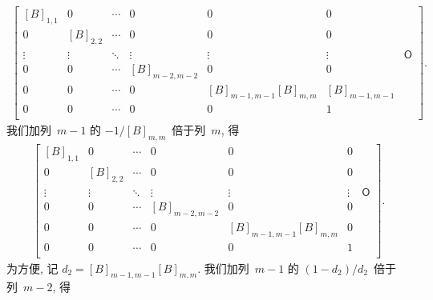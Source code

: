\documentclass[../libro.tex]{subfiles}
\begin{document}
\begin{align*}
    \begin{bmatrix}
        [B]_{1,1} & 0         & \cdots & 0             & 0                       & 0             & {}         \\
        0         & [B]_{2,2} & \cdots & 0             & 0                       & 0             & {}         \\
        \vdots    & \vdots    & \ddots & \vdots        & \vdots                  & \vdots        & \mathsf{O} \\
        0         & 0         & \cdots & [B]_{m-2,m-2} & 0                       & 0             & {}         \\
        0         & 0         & \cdots & 0             & [B]_{m-1,m-1} [B]_{m,m} & [B]_{m-1,m-1} & {}         \\
        0         & 0         & \cdots & 0             & 0                       & 1             & {}         \\
    \end{bmatrix}.
\end{align*}
我们加列~\(m-1\) 的 \(-1/[B]_{m,m}\)~倍于列~\(m\), 得
\begin{align*}
    \begin{bmatrix}
        [B]_{1,1} & 0         & \cdots & 0             & 0                       & 0      & {}         \\
        0         & [B]_{2,2} & \cdots & 0             & 0                       & 0      & {}         \\
        \vdots    & \vdots    & \ddots & \vdots        & \vdots                  & \vdots & \mathsf{O} \\
        0         & 0         & \cdots & [B]_{m-2,m-2} & 0                       & 0      & {}         \\
        0         & 0         & \cdots & 0             & [B]_{m-1,m-1} [B]_{m,m} & 0      & {}         \\
        0         & 0         & \cdots & 0             & 0                       & 1      & {}         \\
    \end{bmatrix}.
\end{align*}
为方便, 记 \(d_2 = [B]_{m-1,m-1} [B]_{m,m}\).
我们加列~\(m-1\) 的 \((1 - d_2)/d_2\)~倍于列~\(m-2\), 得
\end{document}
